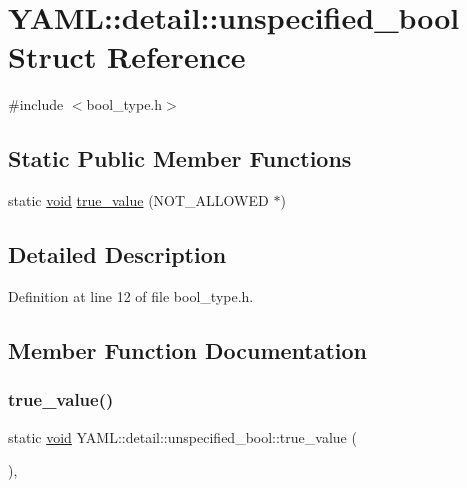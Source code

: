 \hypertarget{struct_y_a_m_l_1_1detail_1_1unspecified__bool}{}\section{Y\+A\+ML\+::detail\+::unspecified\+\_\+bool Struct Reference}
\label{struct_y_a_m_l_1_1detail_1_1unspecified__bool}


{\ttfamily \#include $<$bool\+\_\+type.\+h$>$}

\subsection*{Static Public Member Functions}
\begin{DoxyCompactItemize}
\item 
static \mbox{\hyperlink{glad_8h_a950fc91edb4504f62f1c577bf4727c29}{void}} \mbox{\hyperlink{struct_y_a_m_l_1_1detail_1_1unspecified__bool_a2e8934023c4e607d41d9435b494c165d}{true\+\_\+value}} (N\+O\+T\+\_\+\+A\+L\+L\+O\+W\+ED $\ast$)
\end{DoxyCompactItemize}


\subsection{Detailed Description}


Definition at line 12 of file bool\+\_\+type.\+h.



\subsection{Member Function Documentation}
\mbox{\label{struct_y_a_m_l_1_1detail_1_1unspecified__bool_a2e8934023c4e607d41d9435b494c165d}} 
\subsubsection{\texorpdfstring{true\_value()}{true\_value()}}
{\footnotesize\ttfamily static \mbox{\hyperlink{glad_8h_a950fc91edb4504f62f1c577bf4727c29}{void}} Y\+A\+M\+L\+::detail\+::unspecified\+\_\+bool\+::true\+\_\+value (\begin{DoxyParamCaption}\item[{N\+O\+T\+\_\+\+A\+L\+L\+O\+W\+ED $\ast$}]{ }\end{DoxyParamCaption})\hspace{0.3cm}{\ttfamily [inline]}, {\ttfamily [static]}}



